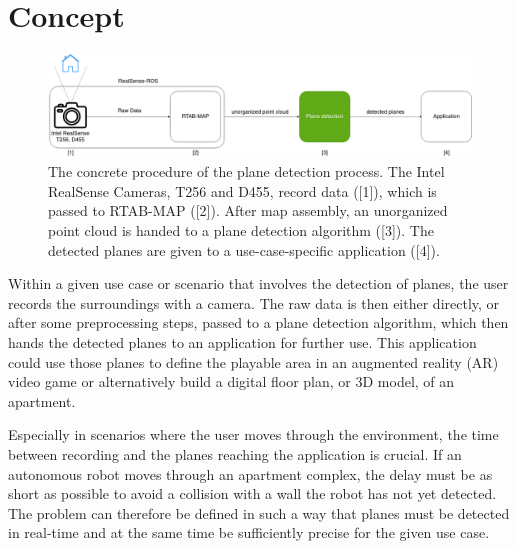 \documentclass[main.tex]{subfiles}
\begin{document}
\chapter{Concept} \label{chap:Concept}


\begin{figure}[H]
    \centering
    \includegraphics[width=15 cm]{images/concept_specific.png}
    \caption[Concrete Concept Graphic]{The concrete procedure of the plane detection process. The Intel RealSense Cameras, T256 and D455, record data ([1]), which is passed to
        RTAB-MAP ([2]). After map assembly, an unorganized point cloud is handed to a plane detection algorithm ([3]).
        The detected planes are given to a use-case-specific application ([4]).}
    \label{fig:concept_spec}
\end{figure}


Within a given use case or scenario that involves the detection of planes, the user records the surroundings with a camera. The raw data is then either
directly, or after some preprocessing steps, passed to a plane detection algorithm, which then hands the detected planes to an application for further use.
This application could use those planes to define the playable area in an augmented reality (AR) video game or alternatively build a digital floor
plan, or 3D model, of an apartment.

Especially in scenarios where the user moves through the environment, the time between recording and the planes reaching the application is crucial.
If an autonomous robot moves through an apartment complex, the delay must be as short as possible to avoid a collision with a wall the robot has not yet detected.
The problem can therefore be defined in such a way that planes must be detected in real-time and at the same time be sufficiently precise for the given use case.
\end{document}

